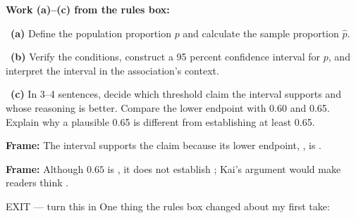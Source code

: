 \documentclass[11pt]{article}
\begin{document}
\newpage
\textbf{Work (a)--(c) from the rules box:}\par\smallskip

~\textbf{(a)} Define the population proportion $p$ and calculate the sample proportion $\hat p$.\par
\workspace{0.7in}

~\textbf{(b)} Verify the conditions, construct a 95 percent confidence interval for $p$, and interpret the interval in the association's context.\par
\workspace{1.4in}

~\textbf{(c)} In 3--4 sentences, decide which threshold claim the interval supports and whose reasoning is better. Compare the lower endpoint with 0.60 and 0.65. Explain why a plausible 0.65 is different from establishing at least 0.65.\par
\workspace{2.0in}

\begin{sentenceframebox}\raggedright\textbf{Frame:} The interval supports the claim \blank[1.7in] because its lower endpoint, \blank[0.7in], is \blank[1.4in].\end{sentenceframebox}

\begin{sentenceframebox}\raggedright\textbf{Frame:} Although $0.65$ is \blank[1.2in], it does not establish \blank[2.0in]; Kai's argument would make readers think \blank[2.2in].\end{sentenceframebox}

\begin{summaryexitbox}{EXIT --- turn this in}
One thing the rules box changed about my first take: \hrulefill\par
\workspace{0.4in}
\end{summaryexitbox}
\end{document}
